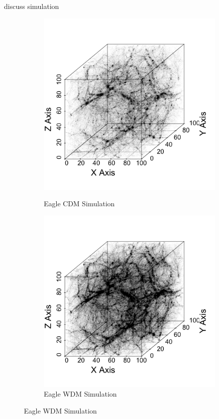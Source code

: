 \documentclass[12pt]{article}
\begin{document}
{\color{red} discuss simulation}
\begin{figure}[htp!]
  \centering
  \begin{subfigure}{.3\textwidth}
    \centering
    \caption{Eagle CDM Simulation}  \includegraphics[width=\linewidth]{figure_1_whole_wdm.png}
    \label{fig:introDataCDM}
  \end{subfigure}
    \begin{subfigure}{.3\textwidth}
    \centering
    \caption{Eagle WDM Simulation}  \includegraphics[width=\linewidth]{figure_1_whole_cdm.png}

\end{subfigure}
\end{figure}
\end{document}
